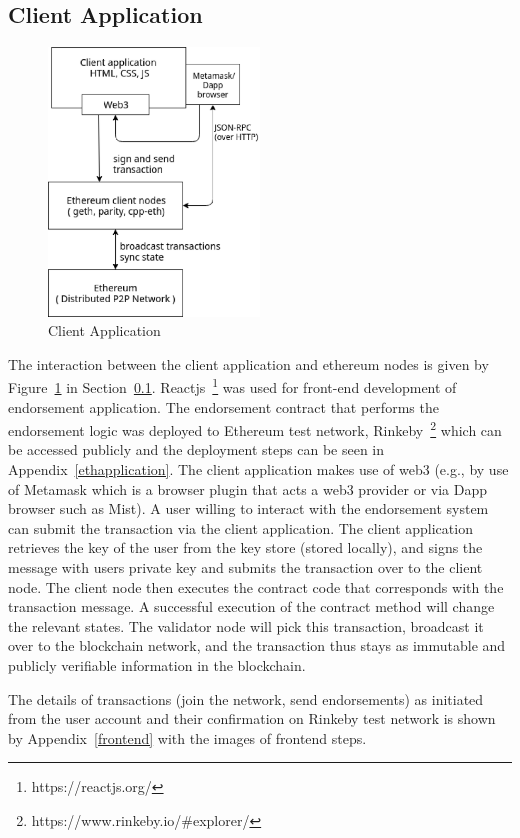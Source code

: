 \subsection{Client Application} \label{clientapp}
\begin{figure}
	\centering
	\includegraphics[width=0.5\textwidth]{Images/ClientApplication.eps}
	\caption{Client Application}
	\label{fig:ClientApp}
\end{figure}
The interaction between the client application and ethereum nodes is given by
Figure~\ref{fig:ClientApp} in Section~\ref{clientapp}.
Reactjs~\footnote{https://reactjs.org/} was used for front-end development of
endorsement application. The endorsement contract that performs the endorsement
logic was deployed to Ethereum test network,
Rinkeby~\footnote{https://www.rinkeby.io/#explorer/} which can be accessed
publicly and the deployment steps can be seen in Appendix~\ref{ethapplication}.
The client application makes use of web3 (e.g., by use of Metamask which is a
browser plugin that acts a web3 provider or via Dapp browser such as Mist). A
user willing to interact with the endorsement system can submit the transaction
via the client application. The client application retrieves the key of the
user from the key store (stored locally), and signs the message with users
private key and submits the transaction over to the client node. The client
node then executes the contract code that corresponds with the transaction
message. A successful execution of the contract method will change the relevant
states.  The validator node will pick this transaction, broadcast it over to
the blockchain network, and the transaction thus stays as immutable and
publicly verifiable information in the blockchain. \par
The details of transactions (join the network, send endorsements) as initiated
from the user account and their confirmation on Rinkeby test network is shown
by Appendix~\ref{frontend} with the images of frontend steps.
	

